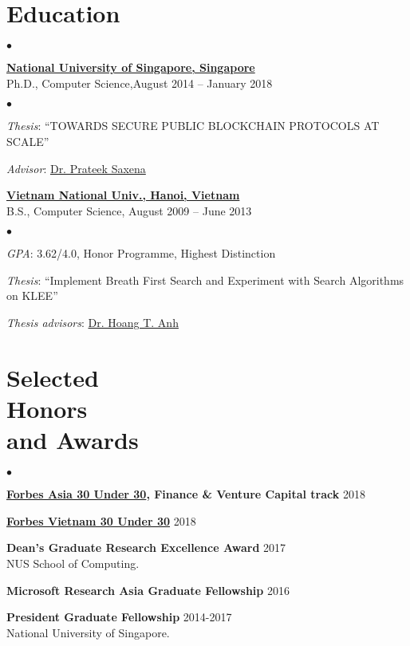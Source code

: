\documentclass[margin,line]{res}
\newenvironment{list0}{
  \begin{list}{$\bullet$}{%
      \setlength{\itemsep}{0.08in}
      \setlength{\parsep}{0in} \setlength{\parskip}{0in}
      \setlength{\topsep}{0in} \setlength{\partopsep}{0in} 
      \setlength{\leftmargin}{0.0in}}}{\end{list}}
\newenvironment{list2}{
  \begin{list}{$\bullet$}{%
      \setlength{\itemsep}{0in}
      \setlength{\parsep}{0in} \setlength{\parskip}{0in}
      \setlength{\topsep}{0in} \setlength{\partopsep}{0in} 
      \setlength{\leftmargin}{0.2in}}}{\end{list}}
\begin{document}
\begin{resume}
\section{\sc Education}
\begin{list0}
\item \href{http://www.nus.edu.sg}{\textbf {National University of Singapore, Singapore}}\\
Ph.D.,  Computer Science,\hfill August 2014 -- January 2018\\
\vspace{-.1in}
\begin{list2}
\item \emph{Thesis}:  ``TOWARDS SECURE PUBLIC BLOCKCHAIN PROTOCOLS AT SCALE'' 
\item \emph{Advisor}: \href{http://www.comp.nus.edu.sg/~prateeks}{Dr. Prateek Saxena}
\end{list2}
\vspace{.1in}
\item \href{http://uet.vnu.nus.edu.vn}{\textbf{Vietnam National Univ., Hanoi, Vietnam}}\\
B.S., Computer Science, \hfill  August 2009 -- June 2013\\
\vspace{-.1in}
\begin{list2}
\item \emph{GPA}: 3.62/4.0, Honor Programme, Highest Distinction
\item \emph{Thesis}:  ``Implement Breath First Search and Experiment with Search Algorithms on KLEE'' 
\item \emph{Thesis advisors}: \href{http://uet.vnu.edu.vn/~hoangta}{Dr. Hoang T. Anh}
\end{list2}
\end{list0}

\section{\sc Selected\\ Honors \\ and Awards} 
\begin{list0}
\item {\bf \href{https://www.forbes.com/30-under-30-asia/2018/finance-venture-capital/#2d0f2b5d547f}{Forbes Asia 30 Under 30}, Finance \& Venture Capital track} \hfill 2018
\item {\bf \href{http://event.forbesvietnam.com/30under30/luutheloi.html}{Forbes Vietnam 30 Under 30}} \hfill 2018
\item {\bf  Dean's Graduate Research Excellence Award} \hfill 2017\\
NUS School of Computing.
\item {\bf Microsoft Research Asia Graduate Fellowship} \hfill 2016
\item {\bf President Graduate Fellowship} \hfill 2014-2017\\
National University of Singapore.
\end{list0}


\end{resume}
\end{document}
